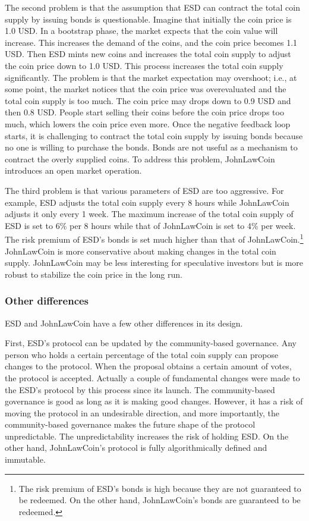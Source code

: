 \documentclass[dvipdfmx,a4paper]{article}
\begin{document}
The second problem is that the assumption that ESD can contract the total coin supply by issuing bonds is questionable. Imagine that initially the coin price is 1.0 USD. In a bootstrap phase, the market expects that the coin value will increase. This increases the demand of the coins, and the coin price becomes 1.1 USD. Then ESD mints new coins and increases the total coin supply to adjust the coin price down to 1.0 USD. This process increases the total coin supply significantly. The problem is that the market expectation may overshoot; i.e., at some point, the market notices that the coin price was overevaluated and the total coin supply is too much. The coin price may drops down to 0.9 USD and then 0.8 USD. People start selling their coins before the coin price drops too much, which lowers the coin price even more. Once the negative feedback loop starts, it is challenging to contract the total coin supply by issuing bonds because no one is willing to purchase the bonds. Bonds are not useful as a mechanism to contract the overly supplied coins. To address this problem, JohnLawCoin introduces an open market operation.

The third problem is that various parameters of ESD are too aggressive. For example, ESD adjusts the total coin supply every 8 hours while JohnLawCoin adjusts it only every 1 week. The maximum increase of the total coin supply of ESD is set to 6\% per 8 hours while that of JohnLawCoin is set to 4\% per week. The risk premium of ESD's bonds is set much higher than that of JohnLawCoin.\footnote{The risk premium of ESD's bonds is high because they are not guaranteed to be redeemed. On the other hand, JohnLawCoin's bonds are guaranteed to be redeemed.} JohnLawCoin is more conservative about making changes in the total coin supply. JohnLawCoin may be less interesting for speculative investors but is more robust to stabilize the coin price in the long run.

\subsubsection{Other differences}

ESD and JohnLawCoin have a few other differences in its design.

First, ESD's protocol can be updated by the community-based governance. Any person who holds a certain percentage of the total coin supply can propose changes to the protocol. When the proposal obtains a certain amount of votes, the protocol is accepted. Actually a couple of fundamental changes were made to the ESD's protocol by this process since its launch. The community-based governance is good as long as it is making good changes. However, it has a risk of moving the protocol in an undesirable direction, and more importantly, the community-based governance makes the future shape of the protocol unpredictable. The unpredictability increases the risk of holding ESD. On the other hand, JohnLawCoin's protocol is fully algorithmically defined and immutable.
\end{document}
